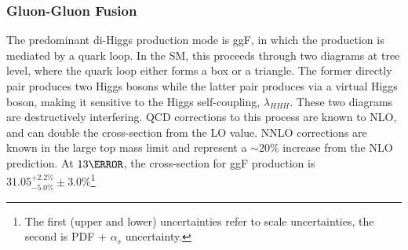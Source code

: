 \subsubsection{Gluon-Gluon Fusion} \label{sssec:ggfHH}

The predominant di-Higgs production mode is \gls{ggF}, in which the production is mediated by a quark loop. In the \gls{SM}, this proceeds through two diagrams at tree level, where the quark loop either forms a box or a triangle. The former directly pair produces two Higgs bosons while the latter pair produces via a virtual Higgs boson, making it sensitive to the Higgs self-coupling, $\lambda_{HHH}$. These two diagrams are destructively interfering. QCD corrections to this process are known to \gls{NLO}, and can double the cross-section from the \gls{LO} value. \gls{NNLO} corrections are known in the large top mass limit and represent a $\sim 20\%$ increase from the \gls{NLO} prediction. At $\unit{13}{\TeV}$, the cross-section for \gls{ggF} production is $31.05^{+2.2\%}_{-5.0\%} \pm 3.0\%$\footnote{The first (upper and lower) uncertainties refer to scale uncertainties, the second is PDF + $\alpha_s$ uncertainty.}  \cite{hh-crosssections}

